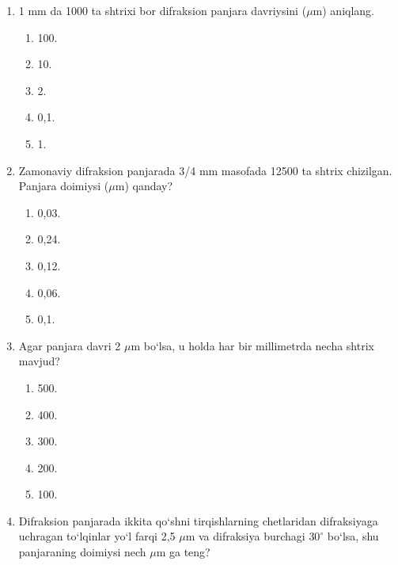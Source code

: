 \begin{enumerate}

\begin{enumerate}[label=\Alph*)]
\item 1,1.
\item 1,88.
\item 0,53.
\item 3,6.
\item 1,71.
\end{enumerate}

\item 1 mm da 1000 ta shtrixi bor difraksion panjara davriysini ($\mu$m) aniqlang.
\begin{enumerate}[label=\Alph*)]
\item 100.
\item 10.
\item 2.
\item 0,1.
\item 1.
\end{enumerate}

\item Zamonaviy difraksion panjarada 3/4 mm masofada 12500 ta shtrix chizilgan. Panjara doimiysi ($\mu$m) qanday?
\begin{enumerate}[label=\Alph*)]
\item 0,03.
\item 0,24.
\item 0,12.
\item 0,06.
\item 0,1.
\end{enumerate}

\item Agar panjara davri 2 $\mu$m bo‘lsa, u holda har bir millimetrda necha shtrix mavjud?
\begin{enumerate}[label=\Alph*)]
\item 500.
\item 400.
\item 300.
\item 200.
\item 100.
\end{enumerate}

\item Difraksion panjarada ikkita qo‘shni tirqishlarning chetlaridan difraksiyaga uchragan to‘lqinlar yo‘l farqi 2,5 $\mu$m va difraksiya burchagi $30^\circ$ bo‘lsa, shu panjaraning doimiysi nech $\mu$m ga teng?


\end{enumerate}
